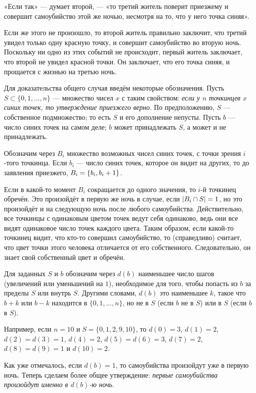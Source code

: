 «Если так» --- думает второй, --- «то третий житель поверит приезжему и совершит самоубийство этой же ночью, несмотря на то, что у него точка синяя».

Если же этого не произошло, то второй житель правильно заключит, что третий увидел только одну красную точку, и совершит самоубийство во вторую ночь.
Поскольку ни одно из этих событий не происходит, первый житель заключает, что второй не увидел красной точки.
Он заключает, что его точка синяя, и прощается с жизнью на третью ночь.

Для доказательства общего случая введём некоторые обозначения.
Пусть $S\subset\{0,1,\dots,n\}$ --- множество чисел $x$ с таким свойством: \emph{если у $n$ точкинцев $x$ синих точек, то утверждение приезжего верно}.
По предположению, $S$ --- собственное подмножество; то есть $S$ и его дополнение непусты.
Пусть $b$ --- число синих точек на самом деле;
$b$ может принадлежать $S$, а может и не принадлежать.

Обозначим через $B_i$ множество возможных чисел синих точек, с точки зрения $i$-того точкинца.
Если $b_i$ --- число синих точек, которое он видит на других, то до заявления приезжего, $B_i=\{b_i,b_i\z+1\}$.

Если в какой-то момент $B_i$ сокращается до одного значения, то $i$-й точкинец обречён.
Это произойдёт в первую же ночь в случае, если  $|B_i\z\cap S|=1$, но это произойдёт и на следующую ночь после любого самоубийства.
Действительно, все точкинцы с одинаковым цветом точек ведут себя одинаково, ведь они все видят одинаковое число точек каждого цвета.
Таким образом, если какой-то точкинец видит, что кто-то совершил самоубийство, то (справедливо) считает, что цвет точки этого человека отличается от его собственного. 
Следовательно, он знает свой собственный цвет и обречён.

Для заданных $S$ и $b$ обозначим через $d(b)$ наименьшее число шагов (увеличений или уменьшений на $1$), необходимое для того, чтобы попасть из $b$ за пределы $S$ или внутрь $S$.
Другими словами, $d(b)$ это наименьшее $k$, такое что $b+k$ или $b-k$ находится в $\{0, 1, \dots, n\}$, но не в $S$ (если $b$ не в  $S$) или в $S$ (если $b$ в $S$).

Например, если $n=10$ и 
$S=\{0,1,2,9,10\}$, то 
$d(0)=3$, 
$d(1)=2$, 
$d(2)=d(3)=1$, 
$d(4)=2$, 
$d(5)=d(6)=3$, 
$d(7)=2$, 
$d(8)=d(9)=1$ и
$d(10)=2$.

Как уже отмечалось, если $d(b)=1$, то самоубийства произойдут уже в первую ночь.
Теперь сделаем более общее утверждение: \emph{первые самоубийства произойдут именно в $d(b)$-ю ночь}.

